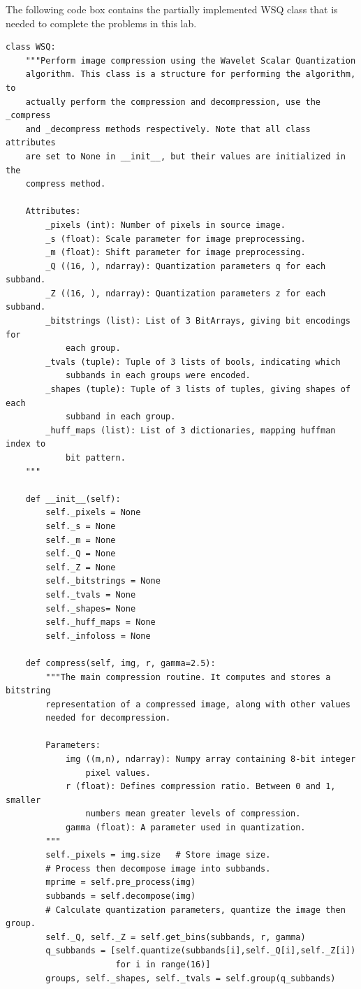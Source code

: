 The following code box contains the partially implemented WSQ class that is needed to complete the problems in this lab.
\begin{lstlisting}
class WSQ:
    """Perform image compression using the Wavelet Scalar Quantization
    algorithm. This class is a structure for performing the algorithm, to
    actually perform the compression and decompression, use the _compress
    and _decompress methods respectively. Note that all class attributes
    are set to None in __init__, but their values are initialized in the
    compress method.

    Attributes:
        _pixels (int): Number of pixels in source image.
        _s (float): Scale parameter for image preprocessing.
        _m (float): Shift parameter for image preprocessing.
        _Q ((16, ), ndarray): Quantization parameters q for each subband.
        _Z ((16, ), ndarray): Quantization parameters z for each subband.
        _bitstrings (list): List of 3 BitArrays, giving bit encodings for
            each group.
        _tvals (tuple): Tuple of 3 lists of bools, indicating which
            subbands in each groups were encoded.
        _shapes (tuple): Tuple of 3 lists of tuples, giving shapes of each
            subband in each group.
        _huff_maps (list): List of 3 dictionaries, mapping huffman index to
            bit pattern.
    """

    def __init__(self):
        self._pixels = None
        self._s = None
        self._m = None
        self._Q = None
        self._Z = None
        self._bitstrings = None
        self._tvals = None
        self._shapes= None
        self._huff_maps = None
        self._infoloss = None

    def compress(self, img, r, gamma=2.5):
        """The main compression routine. It computes and stores a bitstring
        representation of a compressed image, along with other values
        needed for decompression.

        Parameters:
            img ((m,n), ndarray): Numpy array containing 8-bit integer
                pixel values.
            r (float): Defines compression ratio. Between 0 and 1, smaller
                numbers mean greater levels of compression.
            gamma (float): A parameter used in quantization.
        """
        self._pixels = img.size   # Store image size.
        # Process then decompose image into subbands.
        mprime = self.pre_process(img)
        subbands = self.decompose(img)
        # Calculate quantization parameters, quantize the image then group.
        self._Q, self._Z = self.get_bins(subbands, r, gamma)
        q_subbands = [self.quantize(subbands[i],self._Q[i],self._Z[i])
                      for i in range(16)]
        groups, self._shapes, self._tvals = self.group(q_subbands)


\end{lstlisting}

